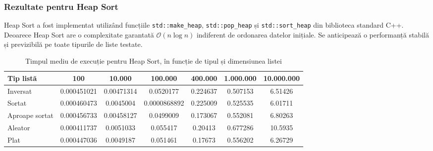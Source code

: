\documentclass{article}
\begin{document}
\subsubsection{Rezultate pentru Heap Sort}

Heap Sort a fost implementat utilizând funcțiile \texttt{std::make\_heap}, \texttt{std::pop\_heap} și \texttt{std::sort\_heap} din biblioteca standard C++. Deoarece Heap Sort are o complexitate garantată $\mathcal{O}(n\log n)$ indiferent de ordonarea datelor inițiale. Se anticipează o performanță stabilă și previzibilă pe toate tipurile de liste testate.

\begin{table}[H]
\centering
\begin{tabular}{|l|c|c|c|c|c|c|}
\hline
\textbf{Tip listă} & \textbf{100} & \textbf{10.000} & \textbf{100.000} & \textbf{400.000} & \textbf{1.000.000} & \textbf{10.000.000} \\
\hline
Inversat & 0.000451021 & 0.00471314 & 0.0520177 & 0.224637 & 0.507153 & 6.51426 \\
\hline
Sortat & 0.000460473 & 0.0045004 & 0.0000868892 & 0.225009 & 0.525535 & 6.01711 \\
\hline
Aproape sortat & 0.000456733 & 0.00458127 & 0.0499009 & 0.173067 & 0.552081 & 6.80263 \\
\hline
Aleator & 0.000411737 & 0.0051033 & 0.055417 & 0.20413 & 0.677286 & 10.5935 \\
\hline
Plat & 0.000447036 & 0.0049187 & 0.051461 & 0.17673 & 0.556202 & 6.26729 \\
\hline
\end{tabular}
\caption{Timpul mediu de execuție pentru Heap Sort, în funcție de tipul și dimensiunea listei}
\label{tab:rezultate-heap}
\end{table}
\end{document}
